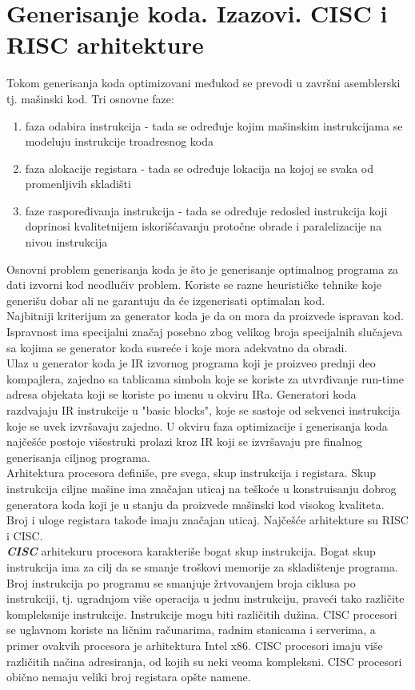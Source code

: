 \documentclass[10pt]{extarticle}
\begin{document}
\section{Generisanje koda. Izazovi. CISC i RISC arhitekture}
\noindent
Tokom generisanja koda optimizovani međukod se prevodi u završni asemblerski tj. mašinski kod. Tri osnovne faze:
\begin{enumerate}
    \item faza odabira instrukcija - tada se određuje kojim mašinskim instrukcijama se modeluju instrukcije troadresnog koda
    \item faza alokacije registara - tada se određuje lokacija na kojoj se svaka od promenljivih skladišti
    \item faze raspoređivanja instrukcija - tada se određuje redosled instrukcija koji doprinosi kvalitetnijem iskorišćavanju protočne obrade i paralelizacije na nivou instrukcija
\end{enumerate}
Osnovni problem generisanja koda je što je generisanje optimalnog programa za dati izvorni kod neodlučiv problem. Koriste se razne heurističke tehnike koje generišu dobar ali ne garantuju da će izgenerisati optimalan kod. \\
Najbitniji kriterijum za generator koda je da on mora da proizvede ispravan kod. Ispravnost ima specijalni značaj posebno zbog velikog broja specijalnih slučajeva sa kojima se generator koda susreće i koje mora adekvatno da obradi. \\
Ulaz u generator koda je IR izvornog programa koji je proizveo prednji deo kompajlera, zajedno sa tablicama simbola koje se koriste za utvrđivanje run-time adresa objekata koji se koriste po imenu u okviru IRa. Generatori koda razdvajaju IR instrukcije u "basic blocks", koje se sastoje od sekvenci instrukcija koje se uvek izvršavaju zajedno. U okviru faza optimizacije i generisanja koda najčešće postoje višestruki prolazi kroz IR koji se izvršavaju pre finalnog generisanja ciljnog programa. \\
Arhitektura procesora definiše, pre svega, skup instrukcija i registara. Skup instrukcija ciljne mašine ima značajan uticaj na teškoće u konstruisanju dobrog generatora koda koji je u stanju da proizvede mašinski kod visokog kvaliteta. Broj i uloge registara takođe imaju značajan uticaj.
Najčešće arhitekture su RISC i CISC. \\
\textit{\textbf{CISC}} arhitekuru procesora karakteriše bogat skup instrukcija. Bogat skup instrukcija ima za cilj da se smanje troškovi memorije za skladištenje programa. Broj instrukcija po programu se smanjuje žrtvovanjem broja ciklusa po instrukciji, tj. ugradnjom više operacija u jednu instrukciju, praveći tako različite kompleksnije instrukcije. Instrukcije mogu biti različitih dužina. CISC procesori se uglavnom koriste na ličnim računarima, radnim stanicama i serverima, a primer ovakvih procesora je arhitektura Intel x86. CISC procesori imaju više različitih načina adresiranja, od kojih su neki veoma kompleksni. CISC procesori obično nemaju veliki broj registara opšte namene. \\
\end{document}
